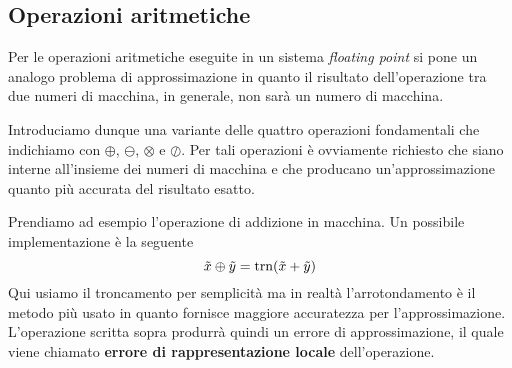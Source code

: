 \subsection{Operazioni aritmetiche}
Per le operazioni aritmetiche eseguite in un sistema \emph{floating point} si pone un analogo problema di
approssimazione in quanto il risultato dell'operazione tra due numeri di macchina, in generale, non sarà
un numero di macchina.

Introduciamo dunque una variante delle quattro operazioni fondamentali che indichiamo con $\oplus$, $\ominus$,
$\otimes$ e $\oslash$. Per tali operazioni è ovviamente richiesto che siano interne all'insieme dei numeri
di macchina e che producano un'approssimazione quanto più accurata del risultato esatto.

Prendiamo ad esempio l'operazione di addizione in macchina. Un possibile implementazione è la seguente
\[ \tilde{x} \oplus \tilde{y} = \operatorname{trn}(\tilde{x} + \tilde{y}) \]
Qui usiamo il troncamento per semplicità ma in realtà l'arrotondamento è il metodo più usato in quanto fornisce
maggiore accuratezza per l'approssimazione. L'operazione scritta sopra produrrà quindi un errore di
approssimazione, il quale viene chiamato \textbf{errore di rappresentazione locale} dell'operazione.

